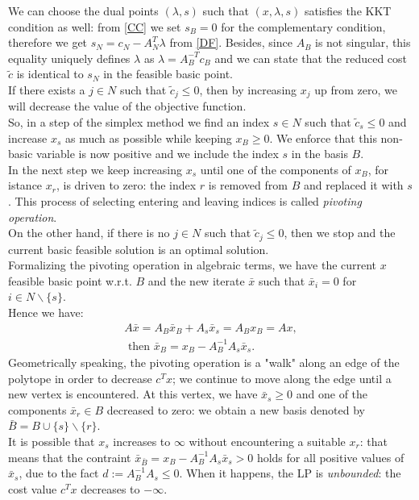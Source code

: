 \documentclass[a4paper,10 pt,titlepage,twoside]{book}
\theoremstyle{plain}
\theoremstyle{definition}
\theoremstyle{remark}
\begin{document}
 We can choose the dual points $(\lambda,s)$ such that $(x, \lambda, s)$ satisfies the KKT condition as well: from \ref{CC} we set $s_{B}= 0$ for the complementary condition, therefore we get $s_{N}= c_{N}- A_{N}^{T}\lambda$ from \ref{DF}. Besides, since $A_{B}$ is not singular, this equality uniquely defines $\lambda$ as $\lambda = A_{B}^{-T}c_{B}$ and we can state that the reduced cost $\tilde{c}$ is identical to $s_{N}$ in the feasible basic point.\\  
 
 If there exists a $j \in N$ such that $\widetilde{c}_{j} \leq 0$, then by increasing $x_{j}$ up from zero, we will decrease the value of the objective function.\\
So, in a step of the simplex method we find an index $s \in N$ such that $\widetilde{c}_{s} \leq 0$ and increase $x_{s}$ as much as possible while keeping $x_{B} \geq 0$. We enforce that this non-basic variable is now positive and we include the index $s$ in the basis $B$.\\
In the next step we keep increasing $x_{s}$ until one of the components of $x_{B}$, for istance $x_{r}$, is driven to zero: the index $r$ is removed from $B$ and replaced it with $s$. This process of selecting entering and leaving indices is called \textit{pivoting operation}. \\
On the other hand, if there is no $j \in N$ such that $\widetilde{c}_{j} \leq 0$, then we stop and the current basic feasible solution is an optimal solution. \\
Formalizing the pivoting operation in algebraic terms, we have the current $x$ feasible basic point w.r.t. $B$ and the new iterate $\bar{x}$ such that $\bar{x}_{i} = 0$ for $i \in N\backslash\{s\}$.\\
Hence we have: 
\begin{align}
	A\bar{x} = A_{B}\bar{x}_{B} +A_{s}\bar{x}_{s} = A_{B}x_{B} = Ax,\\
	\text{  then }
	\bar{x}_{B} = x_{B} - A_{B}^{-1}A_{s}\bar{x}_{s}\label{Bar}.
\end{align}
Geometrically speaking, the pivoting operation is a "walk" along an edge of the polytope in order to decrease $c^{T}x$; we continue to move along the edge until a new vertex is encountered. At this vertex, we have $\bar{x}_{s}\geq0$ and one of the components $\bar{x}_{r}\in B$ decreased to zero: we obtain a new basis denoted by $\bar{B} = B \cup \{s\} \backslash \{r\}$.\\
It is possible that $x_{s}$ increases to $\infty$ without encountering a suitable $x_{r}$: that means that the contraint $\bar{x}_{\bar{B}} = x_{B} - A_{B}^{-1}A_{s}\bar{x}_{s}>0$ holds for all positive values of $\bar{x}_{s}$, due to the fact $d := A_{B}^{-1}A_{s}\leq0$. When it happens, the LP is \textit{unbounded}: the cost value $c^{T}x$ decreases to $-\infty$.\\[0.5cm]
\end{document}
